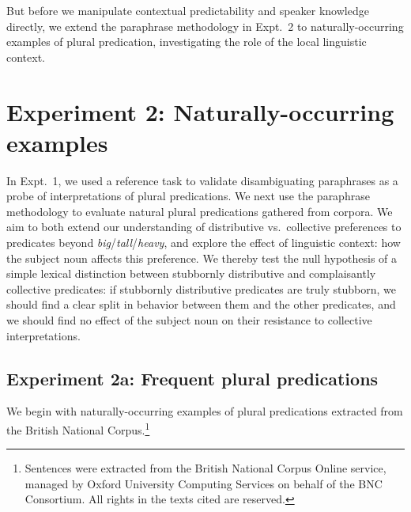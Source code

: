 \documentclass[linguex]{sp}
\newcommand{\ndg}[1]{\textcolor{Green}{[ndg: #1]}}
\begin{document}
But before we manipulate contextual predictability and speaker knowledge directly, we extend the paraphrase methodology in Expt.~2 to naturally-occurring examples of plural predication, investigating the role of the local linguistic context.


\section{Experiment 2: Naturally-occurring examples}

In Expt.~1, we used a reference task to validate disambiguating paraphrases as a probe of interpretations of plural predications. 
We next use the paraphrase methodology to evaluate natural plural predications gathered from corpora. We aim to both extend our understanding of distributive vs.~collective preferences to predicates beyond \emph{big}/\emph{tall}/\emph{heavy}, and explore the effect of linguistic context: how the subject noun affects this preference. We thereby test the null hypothesis of a simple lexical distinction between stubbornly distributive and complaisantly collective predicates: if stubbornly distributive predicates are truly stubborn, we should find a clear split in behavior between them and the other predicates, and we should find no effect of the subject noun on their resistance to collective interpretations.


\subsection{Experiment 2a: Frequent plural predications}

 We begin with naturally-occurring examples of plural predications extracted from the British National Corpus.\footnote{Sentences were extracted from the British National Corpus Online service, managed by Oxford University Computing Services on behalf of the BNC Consortium. All rights in the texts cited are reserved.}
\end{document}
